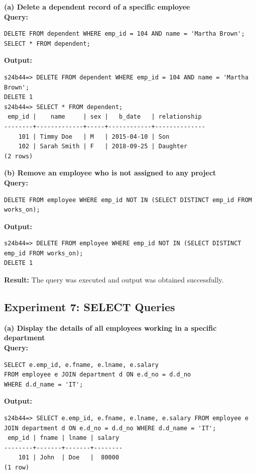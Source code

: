 \documentclass[12pt, a4paper]{article}
\begin{document}
\textbf{(a) Delete a dependent record of a specific employee}\\
\textbf{Query:}
\begin{lstlisting}
DELETE FROM dependent WHERE emp_id = 104 AND name = 'Martha Brown';
SELECT * FROM dependent;
\end{lstlisting}
\textbf{Output:}
\begin{lstlisting}[style=terminal]
s24b44=> DELETE FROM dependent WHERE emp_id = 104 AND name = 'Martha Brown';
DELETE 1
s24b44=> SELECT * FROM dependent;
 emp_id |    name     | sex |   b_date   | relationship 
--------+-------------+-----+------------+--------------
    101 | Timmy Doe   | M   | 2015-04-10 | Son
    102 | Sarah Smith | F   | 2018-09-25 | Daughter
(2 rows)
\end{lstlisting}

\textbf{(b) Remove an employee who is not assigned to any project}\\
\textbf{Query:}
\begin{lstlisting}
DELETE FROM employee WHERE emp_id NOT IN (SELECT DISTINCT emp_id FROM works_on);
\end{lstlisting}
\textbf{Output:}
\begin{lstlisting}[style=terminal]
s24b44=> DELETE FROM employee WHERE emp_id NOT IN (SELECT DISTINCT emp_id FROM works_on);
DELETE 1
\end{lstlisting}
\textbf{Result:} The query was executed and output was obtained successfully.


\newpage
\subsection*{Experiment 7: SELECT Queries}

\textbf{(a) Display the details of all employees working in a specific department}\\
\textbf{Query:}
\begin{lstlisting}
SELECT e.emp_id, e.fname, e.lname, e.salary 
FROM employee e JOIN department d ON e.d_no = d.d_no 
WHERE d.d_name = 'IT';
\end{lstlisting}
\textbf{Output:}
\begin{lstlisting}[style=terminal]
s24b44=> SELECT e.emp_id, e.fname, e.lname, e.salary FROM employee e JOIN department d ON e.d_no = d.d_no WHERE d.d_name = 'IT';
 emp_id | fname | lname | salary 
--------+-------+-------+--------
    101 | John  | Doe   |  80000
(1 row)
\end{lstlisting}
\end{document}
